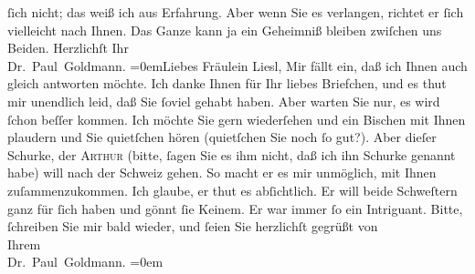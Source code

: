 \begin{ledgroupsized}[t]{13cm}
               ſich nicht; das weiß ich aus Erfahrung. Aber wenn Sie es verlangen, richtet er ſich
               vielleicht nach Ihnen. Das Ganze kann ja ein Geheimniß bleiben zwiſchen uns  Beiden.\pend
           \pstart
           Herzlichſt Ihr {\\[\baselineskip]}\spacefill\mbox{Dr. Paul Goldmann.}\pend
           \leftskip=0em{}{\bigskip}\pstart{}{\pb}Liebes Fräulein Liesl,\pend\pstart
           Mir fällt ein, daß ich Ihnen auch gleich antworten möchte. Ich danke Ihnen für Ihr
               liebes Briefchen, und es thut mir unendlich leid, daß Sie ſoviel \label{K_L03071-12v}\label{K_L03071-12h} gehabt
               haben. Aber warten Sie nur, es wird ſchon beſſer kommen. Ich möchte Sie gern
               wiederſehen und ein Bischen mit Ihnen plaudern und Sie quietſchen hören (quietſchen
               Sie noch ſo gut?). Aber dieſer {\pb}Schurke, der \textsc{Arthur} (bitte,  ſagen Sie es ihm \strikeout{\textcolor{gray}{×}\-\textcolor{gray}{×}\-\textcolor{gray}{×}} nicht, daß ich ihn Schurke genannt habe) will nach der Schweiz gehen. So macht er es mir unmöglich, mit Ihnen
               zuſammenzukommen. Ich glaube, er thut es abſichtlich. Er will beide Schweſtern ganz für ſich haben und gönnt ſie Keinem.
               Er war immer ſo ein Intriguant.\pend
           \pstart
           {\pb}Bitte, ſchreiben Sie mir bald wieder, und ſeien Sie
               herzlichſt gegrüßt von {\\[\baselineskip]}Ihrem {\\[\baselineskip]}\spacefill\mbox{Dr. Paul Goldmann.}\pend
           \leftskip=0em{}
         
         \endnumbering{}\end{ledgroupsized}  \newcommand{\dateiname}{L03071}\newcommand{\titel}{Paul Goldmann an Arthur Schnitzler, Olga und Elisabeth Gussmann, 3. 7. [1901]}\newcommand{\editorInnen}{Martin Anton Müller und Laura Untner}
      